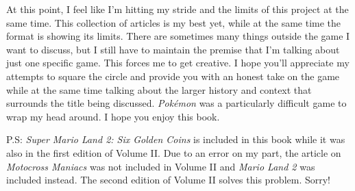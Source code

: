 \documentclass{book}
\begin{document}
At this point, I feel like I’m hitting my stride and the limits of this project at the same time. This collection of articles is my best yet, while at the same time the format is showing its limits. There are sometimes many things outside the game I want to discuss, but I still have to maintain the premise that I’m talking about just one specific game. This forces me to get creative. I hope you’ll appreciate my attempts to square the circle and provide you with an honest take on the game while at the same time talking about the larger history and context that surrounds the title being discussed. \emph{Pokémon} was a particularly difficult game to wrap my head around. I hope you enjoy this book.

P.S: \emph{Super Mario Land 2: Six Golden Coins} is included in this book while it was also in the first edition of Volume II. Due to an error on my part, the article on \emph{Motocross Maniacs} was not included in Volume II and \emph{Mario Land 2} was included instead. The second edition of Volume II solves this problem. Sorry!
\end{document}
